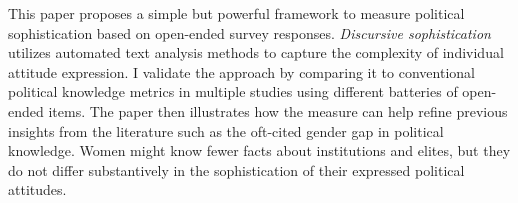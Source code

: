 This paper proposes a simple but powerful framework to measure political sophistication based on open-ended survey responses. \textit{Discursive sophistication} utilizes automated text analysis methods to capture the complexity of individual attitude expression. I validate the approach by comparing it to conventional political knowledge metrics in multiple studies using different batteries of open-ended items. The paper then illustrates how the measure can help refine previous insights from the literature such as the oft-cited gender gap in political knowledge. Women might know fewer facts about institutions and elites, but they do not differ substantively in the sophistication of their expressed political attitudes.
